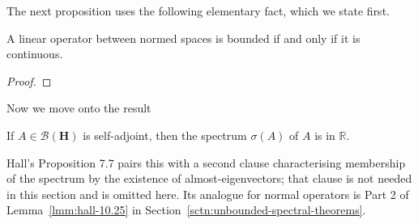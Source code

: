 The next proposition uses the following elementary fact, which we state first.

\begin{proposition}
    \label{prpstn:bounded-operators-are-continuous}
    \leanok
    A linear operator between normed spaces is bounded if and only if it is continuous.
\end{proposition}
\begin{proof}
\leanok
\end{proof}

Now we move onto the result

\begin{proposition}
    \label{prpstn:hall-7.7}
    \leanok
    If $A \in \mathcal{B}(\mathbf{H})$ is self-adjoint, then the spectrum $\sigma(A)$ of $A$ is in $\mathbb{R}$.

    Hall's Proposition 7.7 pairs this with a second clause characterising membership of the spectrum by the existence of almost-eigenvectors; that clause is not needed in this section and is omitted here. Its analogue for normal operators is Part 2 of Lemma~\ref{lmm:hall-10.25} in Section~\ref{sctn:unbounded-spectral-theorems}.
\end{proposition}
